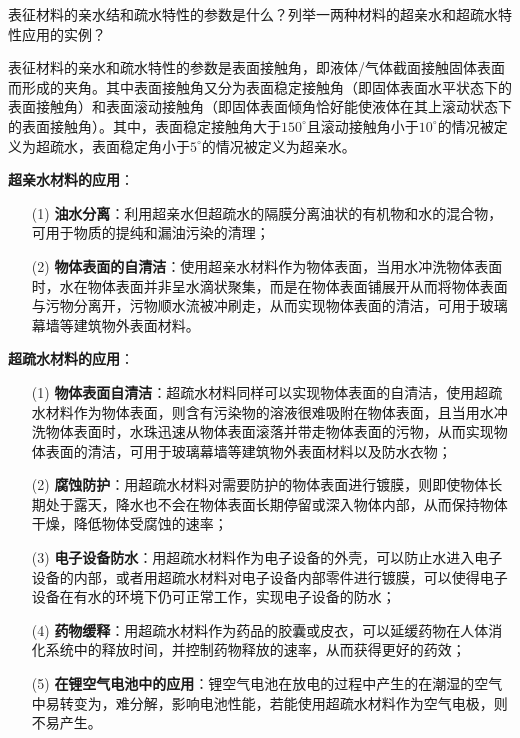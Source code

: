 \documentclass{assignment}
\begin{document}
\begin{ti}
    表征材料的亲水结和疏水特性的参数是什么？列举一两种材料的超亲水和超疏水特性应用的实例？
\end{ti}
\begin{da}
    表征材料的亲水和疏水特性的参数是表面接触角，即液体/气体截面接触固体表面而形成的夹角。其中表面接触角又分为表面稳定接触角（即固体表面水平状态下的表面接触角）和表面滚动接触角（即固体表面倾角恰好能使液体在其上滚动状态下的表面接触角）。其中，表面稳定接触角大于$150^{\circ}$且滚动接触角小于$10^{\circ}$的情况被定义为超疏水，表面稳定角小于$5^{\circ}$的情况被定义为超亲水。

    \textbf{超亲水材料的应用}：
    \begin{itemize}
        \item[(1)] \textbf{油水分离}：利用超亲水但超疏水的隔膜分离油状的有机物和水的混合物，可用于物质的提纯和漏油污染的清理；
        \item[(2)] \textbf{物体表面的自清洁}：使用超亲水材料作为物体表面，当用水冲洗物体表面时，水在物体表面并非呈水滴状聚集，而是在物体表面铺展开从而将物体表面与污物分离开，污物顺水流被冲刷走，从而实现物体表面的清洁，可用于玻璃幕墙等建筑物外表面材料。
    \end{itemize}

    \textbf{超疏水材料的应用}：
    \begin{itemize}
        \item[(1)] \textbf{物体表面自清洁}：超疏水材料同样可以实现物体表面的自清洁，使用超疏水材料作为物体表面，则含有污染物的溶液很难吸附在物体表面，且当用水冲洗物体表面时，水珠迅速从物体表面滚落并带走物体表面的污物，从而实现物体表面的清洁，可用于玻璃幕墙等建筑物外表面材料以及防水衣物；
        \item[(2)] \textbf{腐蚀防护}：用超疏水材料对需要防护的物体表面进行镀膜，则即使物体长期处于露天，降水也不会在物体表面长期停留或深入物体内部，从而保持物体干燥，降低物体受腐蚀的速率；
        \item[(3)] \textbf{电子设备防水}：用超疏水材料作为电子设备的外壳，可以防止水进入电子设备的内部，或者用超疏水材料对电子设备内部零件进行镀膜，可以使得电子设备在有水的环境下仍可正常工作，实现电子设备的防水；
        \item[(4)] \textbf{药物缓释}：用超疏水材料作为药品的胶囊或皮衣，可以延缓药物在人体消化系统中的释放时间，并控制药物释放的速率，从而获得更好的药效；
        \item[(5)] \textbf{在锂空气电池中的应用}：锂空气电池在放电的过程中产生的在潮湿的空气中易转变为，难分解，影响电池性能，若能使用超疏水材料作为空气电极，则不易产生。
    \end{itemize}
\end{da}
\end{document}
